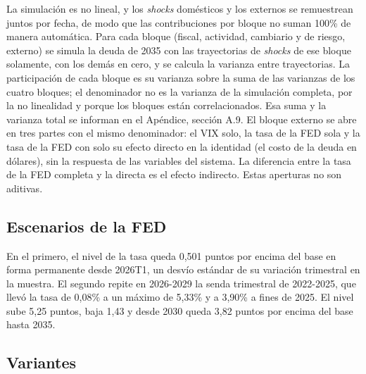 La simulación es no lineal, y los \emph{shocks} domésticos y los
externos se remuestrean juntos por fecha, de modo que las contribuciones
por bloque no suman 100\% de manera automática. Para cada bloque
(fiscal, actividad, cambiario y de riesgo, externo) se simula la deuda
de 2035 con las trayectorias de \emph{shocks} de ese bloque solamente,
con los demás en cero, y se calcula la varianza entre trayectorias. La
participación de cada bloque es su varianza sobre la suma de las
varianzas de los cuatro bloques; el denominador no es la varianza de la
simulación completa, por la no linealidad y porque los bloques están
correlacionados. Esa suma y la varianza total se informan en el
Apéndice, sección A.9. El bloque externo se abre en tres partes con el
mismo denominador: el VIX solo, la tasa de la FED sola y la tasa de la
FED con solo su efecto directo en la identidad (el costo de la deuda en
dólares), sin la respuesta de las variables del sistema. La diferencia
entre la tasa de la FED completa y la directa es el efecto indirecto.
Estas aperturas no son aditivas.

\subsection{Escenarios de la FED}

En el primero, el nivel de la tasa queda 0,501 puntos por encima del
base en forma permanente desde 2026T1, un desvío estándar de su
variación trimestral en la muestra. El segundo repite en 2026-2029 la
senda trimestral de 2022-2025, que llevó la tasa de 0,08\% a un máximo
de 5,33\% y a 3,90\% a fines de 2025. El nivel sube 5,25 puntos, baja
1,43 y desde 2030 queda 3,82 puntos por encima del base hasta 2035.

\subsection{Variantes}


